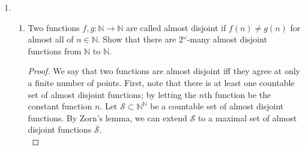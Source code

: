 \documentclass{article}
\begin{document}
\begin{enumerate}[label={\bf Q\arabic*:}]
\begin{proof}
      Fix any $y\in\mathbb{S}\setminus\mathbb{R}$. Assume by contradiction
      that $\mathbb{S}$ does not realize $p$, and consider the ordering of
      $\mathbb{S}$ restricted to $\mathbb{R}\cup\{y\}$. Partition
      $\mathbb{R}$ into two disjoint sets $R_1=\{r<y:r\in\mathbb{R}\}$ and
      $R_2=\{r>y:r\in\mathbb{R}\}$. Note that the two sets are disjoint,
      their union is $\mathbb{R}$, and elements in $R_1$ are smaller than
      all elements in $R_2$, because $\mathbb{R}$ and thus $\mathbb{S}$
      satisfy the axioms of linear ordering. Then from assumption,
      $\sup{R_1}$ and $\inf{R_2}$ are contained in $\mathbb{R}$, and from
      the axioms of linear ordering these values must be equal. Hence we
      have $a=\sup{R_1}=\inf{R_2}\in\mathbb{R}$. Then since $R_1\cup
      R_2=\mathbb{R}$, $a$ must belong to either $R_1$ or $R_2$. Assume
      without loss of generality that $a\in R_1$. \\

      Consider the element $y-a\in\mathbb{S}$ and its multiplicative
      inverse $(y-a)^{-1}\in\mathbb{S}$. Since $a\in R_1$, we have $y-a>0$.
      Then the multiplicative inverse $(y-a)^{-1}$ must also be greater
      than 0, because $\mathcal{R}$ and thus $\mathcal{S}$ satisfies the
      sentence which says that the multiplicative inverse of a positive
      element is also positive. Then from assumption, $0\leq(y-a)^{-1}\leq
      N$ for some $N\in\mathbb{N}^+$. At the same time, since $a\not\in
      R_2$, we have $0<y-a<1/N$. Multiplying these two inequalities give us
      $1=(y-a)^{-1}\cdot(y-a)<N\cdot 1/N=1$, a contradiction. Note that we
      can multiply these inequalities because $\mathcal{R}$ and thus
      $\mathcal{S}$ satisfies the sentence that says if $0\leq a_1\leq a_2$
      and $0<b_1<b_2$ then $a_1\cdot b_1\leq a_2\cdot b_2$.
    \end{proof}

  \item
    \begin{enumerate}
      \item Two functions $f,g:\mathbb{N}\rightarrow\mathbb{N}$ are called
        almost disjoint if $f(n)\neq g(n)$ for almost all of
        $n\in\mathbb{N}$. Show that there are $2^\omega$-many almost
        disjoint functions from $\mathbb{N}$ to $\mathbb{N}$.

        \begin{proof}
          We say that two functions are almost disjoint iff they agree at
          only a finite number of points. First, note that there is at
          least one countable set of almost disjoint functions; by letting
          the $n$th function be the constant function $n$. Let
          $\mathcal{S}\subset\mathbb{N}^{\mathbb{N}}$ be a countable set of
          almost disjoint functions. By Zorn's lemma, we can extend
          $\mathcal{S}$ to a maximal set of almost disjoint functions
          $\overline{\mathcal{S}}$. \\


\end{proof}
\end{enumerate}
\end{enumerate}
\end{document}
